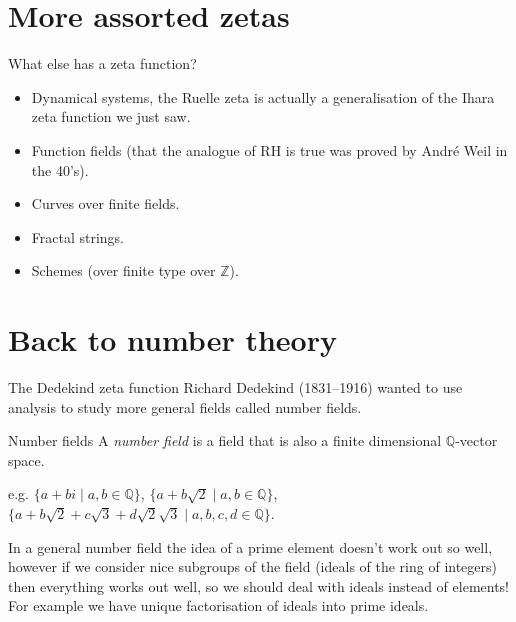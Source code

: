 \documentclass{beamer}
\begin{document}
\section[More zetas]{More assorted zetas}


\begin{frame}{What else has a zeta function?}
\begin{itemize}
\pause\item Dynamical systems, the Ruelle zeta is actually a generalisation of the Ihara zeta function we just saw.
\pause\item Function fields (that the analogue of RH is true was proved by Andr\'e Weil in the 40's).
\pause\item Curves over finite fields.
\pause\item Fractal strings.
\pause\item Schemes (over finite type over $\mathbb{Z}$).
\end{itemize}
\end{frame}

\section[Number theory again]{Back to number theory}
\begin{frame}{The Dedekind zeta function}
Richard Dedekind (1831--1916) wanted to use analysis to study more general fields called number fields.

\pause \begin{block}{Number fields}
A \emph{number field} is a field that is also a finite dimensional $\mathbb{Q}$-vector space.
\end{block}

\pause e.g. $\{a+bi\mid a,b\in\mathbb{Q}\}$, \pause $\{a+b\sqrt{2}\mid a,b\in\mathbb{Q}\}$, \pause $\{a+b\sqrt{2} +c\sqrt{3}+d\sqrt{2}\sqrt{3}\mid a,b,c,d\in\mathbb{Q}\}$.

\pause In a general number field the idea of a prime element doesn't work out so well, however if we consider nice subgroups of the field (ideals of the ring of integers) then everything works out well, so we should deal with ideals instead of elements!
\pause For example we  have unique factorisation of ideals into prime ideals.
\end{frame}
\end{document}

